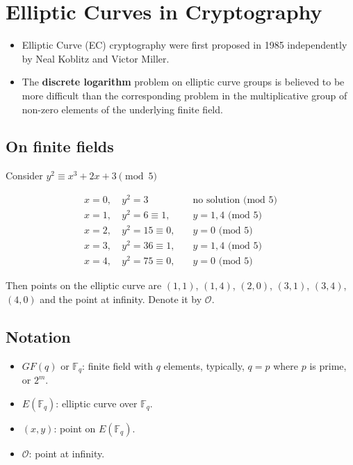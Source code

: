 \chapter{Elliptic Curves in Cryptography}

\begin{itemize}
	\item Elliptic Curve (EC) cryptography were first proposed in 1985 independently by Neal Koblitz and Victor Miller.
	\item The \textbf{discrete logarithm} problem on elliptic curve groups is believed to be more difficult than the corresponding problem in the multiplicative group of non-zero elements of the underlying finite field.
\end{itemize}

\section*{On finite fields}

Consider \(y^2 \equiv x^3 + 2x + 3 \pmod{5}\)

\begin{align*}
	x = 0, &\ y^2 = 3 \quad &\text{no solution (mod 5)} \\
	x = 1, &\ y^2 = 6 \equiv 1, \quad &y = 1,4 \text{ (mod 5)} \\
	x = 2, &\ y^2 = 15 \equiv 0, \quad &y = 0 \text{ (mod 5)} \\
	x = 3, &\ y^2 = 36 \equiv 1, \quad &y = 1,4 \text{ (mod 5)} \\
	x = 4, &\ y^2 = 75 \equiv 0, \quad &y = 0 \text{ (mod 5)}
\end{align*}

Then points on the elliptic curve are \((1,1)\), \((1,4)\), \((2,0)\), \((3,1)\), \((3,4)\), \((4,0)\) and the point at infinity. Denote it by \( \mathcal{O} \).

\section*{Notation}

\begin{itemize}
	\item \( GF(q) \) or \( \mathbb{F}_q \): finite field with \( q \) elements, typically, \( q = p \) where \( p \) is prime, or \( 2^m \).
	\item \( E(\mathbb{F}_q) \): elliptic curve over \( \mathbb{F}_q \).
	\item \( (x, y) \): point on \( E(\mathbb{F}_q) \).
	\item \( \mathcal{O} \): point at infinity.
\end{itemize}


